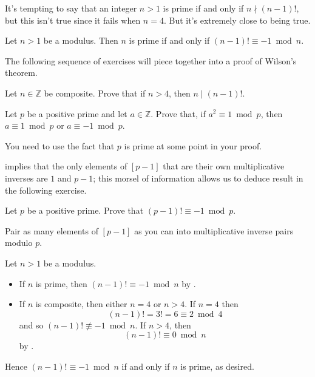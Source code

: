 It's tempting to say that an integer $n>1$ is prime if and only if $n \nmid (n-1)!$, but this isn't true since it fails when $n=4$. But it's extremely close to being true.

\begin{theorem} \label{thmWilson}
Let $n>1$ be a modulus. Then $n$ is prime if and only if $(n-1)! \equiv -1 \bmod n$.
\end{theorem}

The following sequence of exercises will piece together into a proof of Wilson's theorem.

\begin{exercise} \label{exCompositeDividesFactorial}
Let $n \in \mathbb{Z}$ be composite. Prove that if $n>4$, then $n \mid (n-1)!$.
\end{exercise}

\begin{exercise} \label{exSquareCongruentToOneModPrimeUnit}
Let $p$ be a positive prime and let $a \in \mathbb{Z}$. Prove that, if $a^2 \equiv 1 \bmod p$, then $a \equiv 1 \bmod p$ or $a \equiv {-1} \bmod p$. 
\begin{backhint}
You need to use the fact that $p$ is prime at some point in your proof.
\end{backhint}
\end{exercise}

 implies that the only elements of $[p-1]$ that are their own multiplicative inverses are $1$ and $p-1$; this morsel of information allows us to deduce result in the following exercise.

\begin{exercise}
\label{exPrimeFactorialCongruentToMinusOne}
Let $p$ be a positive prime. Prove that $(p-1)! \equiv -1 \bmod p$.
\begin{backhint}
Pair as many elements of $[p-1]$ as you can into multiplicative inverse pairs modulo $p$.
\end{backhint}
\end{exercise}

\begin{cproof}
Let $n>1$ be a modulus.
\begin{itemize} 
\item If $n$ is prime, then $(n-1)! \equiv -1 \bmod n$ by .
\item If $n$ is composite, then either $n=4$ or $n>4$. If $n=4$ then
\[ (n-1)! = 3! = 6 \equiv 2 \bmod 4 \]
and so $(n-1)! \not\equiv -1 \bmod n$. If $n>4$, then
\[ (n-1)! \equiv 0 \bmod n \]
by .
\end{itemize}
Hence $(n-1)! \equiv -1 \bmod n$ if and only if $n$ is prime, as desired.
\end{cproof}

